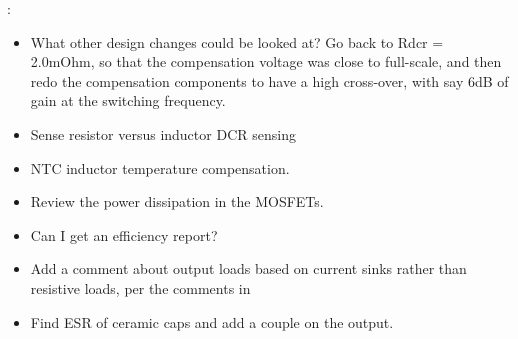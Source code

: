 :
\begin{itemize}
\item What other design changes could be looked at? Go back to
Rdcr = 2.0mOhm, so that the compensation voltage was close to
full-scale, and then redo the compensation components to have
a high cross-over, with say 6dB of gain at the switching frequency. 
\item Sense resistor versus inductor DCR sensing
\item NTC inductor temperature compensation.
\item Review the power dissipation in the MOSFETs.
\item Can I get an efficiency report?
\item Add a comment about output loads based on current sinks rather
than resistive loads, per the comments in~\cite{Linear_DC247_1999}
\item Find ESR of ceramic caps and add a couple on the output.
\end{itemize}

